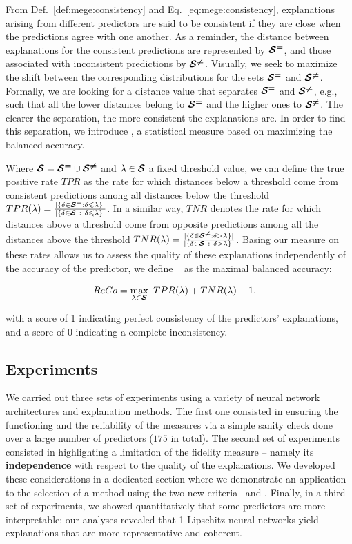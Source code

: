 From Def.~\ref{def:mege:consistency} and Eq.~\ref{eq:mege:consistency}, explanations arising from different predictors are said to be consistent if they are close when the predictions agree with one another.
As a reminder, the distance between explanations for the consistent predictions are represented by $\boldsymbol{\mathcal{S}^{ = }}$, and those associated with inconsistent predictions by $\boldsymbol{\mathcal{S}^{ \ne }}$. 
Visually, we seek to maximize the shift between the corresponding distributions for the sets $\boldsymbol{\mathcal{S}^{ = }}$ and $\boldsymbol{\mathcal{S}^{ \ne }}$.
Formally, we are looking for a distance value that separates $\boldsymbol{\mathcal{S}^{ = }}$ and $\boldsymbol{\mathcal{S}^{ \ne }}$, e.g., such that all the lower distances belong to $\boldsymbol{\mathcal{S}^{ = }}$ and the higher ones to $\boldsymbol{\mathcal{S}^{ \ne }}$. The clearer the separation, the more consistent the explanations are.
In order to find this separation, we introduce \reco, a statistical measure based on maximizing the balanced accuracy.

Where $ \boldsymbol{\mathcal{S}} = \boldsymbol{\mathcal{S}^{ = }} \cup \boldsymbol{\mathcal{S}^{ \ne }} $ and $\lambda \in \boldsymbol{\mathcal{S}}$ a fixed threshold value, we can define the true positive rate $TPR$ as the rate for which distances below a threshold come from consistent predictions among all distances below the threshold $TPR(\lambda) = \frac{|\{\delta \in \Setm : \delta \leqslant \lambda \}|} {|\{ \delta \in \Seta~:~ \delta \leqslant \lambda \}| \hfill}$. In a similar way, $TNR$ denotes the rate for which distances above a threshold come from opposite predictions among all the distances above the threshold $TNR(\lambda) = \frac{|\{ \delta \in \Setp : \delta > \lambda \}|}{|\{ \delta \in \Seta~:~ \delta > \lambda \}| \hfill}$. Basing our measure on these rates allows us to assess the quality of these explanations independently of the accuracy of the predictor, we define \reco~ as the maximal balanced accuracy:

\begin{align}
    ReCo &= \max_{\lambda \in \boldsymbol{\mathcal{S}}}\ TPR(\lambda) + TNR(\lambda) - 1, 
    \label{eq:mege:reco}
\end{align}

with a score of 1 indicating perfect consistency of the predictors' explanations, and a score of 0 indicating a complete inconsistency.

\subsection{Experiments}

We carried out three sets of experiments using a variety of neural network architectures and explanation methods. 
The first one consisted in ensuring the functioning and the reliability of the measures via a simple sanity check done over a large number of predictors ($175$ in total).
The second set of experiments consisted in highlighting a limitation of the fidelity measure -- namely its \textbf{independence} with respect to the quality of the explanations. 
We developed these considerations in a dedicated section where we demonstrate an application to the selection of a method using the two new criteria \mege~and \reco.
Finally, in a third set of experiments, we showed quantitatively that some predictors are more interpretable: our analyses revealed that 1-Lipschitz neural networks yield explanations that are more representative and coherent.

